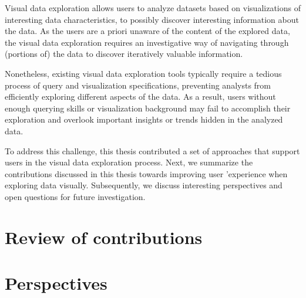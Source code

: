 Visual data exploration allows users to analyze datasets based on visualizations of interesting data characteristics, to possibly discover interesting information about the data.
As the users are a priori unaware of the content of the explored data, the visual data exploration requires an investigative way of navigating through (portions of) the data to discover iteratively valuable information.

Nonetheless, existing visual data exploration tools typically require a tedious process of query and visualization specifications, preventing analysts from efficiently exploring different aspects of the data. 
 As a result, users without enough querying skills or visualization background may fail to accomplish their exploration and overlook important insights or trends hidden in the analyzed data.
 
To address this challenge, this thesis contributed a set of approaches that support users in the visual data exploration process.
Next, we summarize the contributions discussed in this thesis towards improving user 'experience when exploring data visually.
Subsequently, we discuss interesting perspectives and open questions for future investigation.
     
        \section{Review of contributions}
        
	\section{Perspectives}
	  



